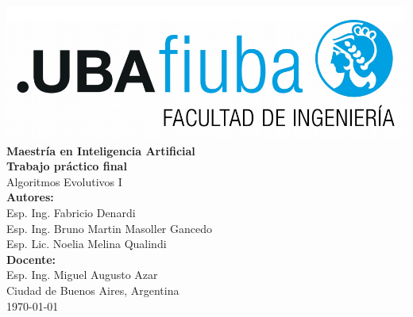 \begin{titlepage}
    \centering
    \includegraphics[width=1\textwidth]{Figures/logoFIUBA.pdf}\\[2cm]

    {\Large \textbf{Maestría en Inteligencia Artificial}}\\[1cm]

    {\Huge \textbf{Trabajo práctico final}}\\[0.5cm]
    {\Large Algoritmos Evolutivos I}\\[2cm]

    \textbf{Autores:}\\[0.3cm]
    Esp. Ing. Fabricio Denardi \\ 
    Esp. Ing. Bruno Martin	Masoller Gancedo \\
    Esp. Lic. Noelia Melina	Qualindi \\[1cm]
    
    \textbf{Docente:} \\[0.3cm]Esp. Ing. Miguel Augusto	Azar \\[2cm]

    \vfill
    {\large Ciudad de Buenos Aires, Argentina \\[0.3cm]
    \today}
\end{titlepage}
